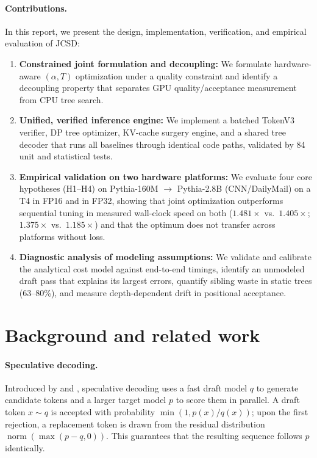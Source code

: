 \documentclass[10pt]{article}
\DeclareMathOperator{\norm}{norm}
\begin{document}
\paragraph{Contributions.} In this report, we present the design, implementation, verification, and empirical evaluation of JCSD:
\begin{enumerate}
    \item \textbf{Constrained joint formulation and decoupling:} We formulate hardware-aware $(\alpha, T)$ optimization under a quality constraint and identify a decoupling property that separates GPU quality/acceptance measurement from CPU tree search.
    \item \textbf{Unified, verified inference engine:} We implement a batched TokenV3 verifier, DP tree optimizer, KV-cache surgery engine, and a shared tree decoder that runs all baselines through identical code paths, validated by 84 unit and statistical tests.
    \item \textbf{Empirical validation on two hardware platforms:} We evaluate four core hypotheses (H1--H4) on Pythia-160M $\to$ Pythia-2.8B (CNN/DailyMail) on a T4 in FP16 and in FP32, showing that joint optimization outperforms sequential tuning in measured wall-clock speed on both ($1.481\times$ vs.\ $1.405\times$; $1.375\times$ vs.\ $1.185\times$) and that the optimum does not transfer across platforms without loss.
    \item \textbf{Diagnostic analysis of modeling assumptions:} We validate and calibrate the analytical cost model against end-to-end timings, identify an unmodeled draft pass that explains its largest errors, quantify sibling waste in static trees (63--80\%), and measure depth-dependent drift in positional acceptance.
\end{enumerate}

\section{Background and related work}

\paragraph{Speculative decoding.} Introduced by \citet{leviathan2023fast} and \citet{chen2023accelerating}, speculative decoding uses a fast draft model $q$ to generate candidate tokens and a larger target model $p$ to score them in parallel. A draft token $x \sim q$ is accepted with probability $\min(1, p(x)/q(x))$; upon the first rejection, a replacement token is drawn from the residual distribution $\norm(\max(p - q, 0))$. This guarantees that the resulting sequence follows $p$ identically.
\end{document}
